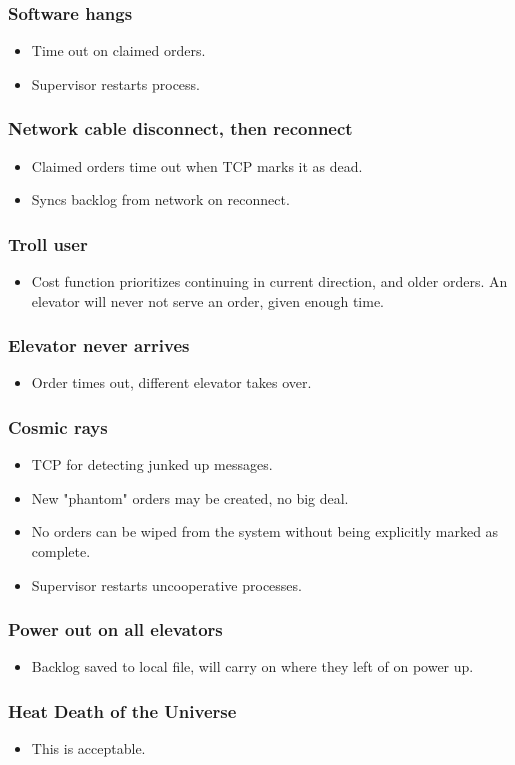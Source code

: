\documentclass[11pt,a4paper]{article}
\begin{document}
\subsubsection*{Software hangs}
\begin{itemize}
\item Time out on claimed orders.
\item Supervisor restarts process.
\end{itemize}
\subsubsection*{Network cable disconnect, then reconnect}
\begin{itemize}
\item Claimed orders time out when TCP marks it as dead.
\item Syncs backlog from network on reconnect.
\end{itemize}
\subsubsection*{Troll user}
\begin{itemize}
\item Cost function prioritizes continuing in current direction, and older orders. An elevator will never not serve an order, given enough time.
\end{itemize}
\subsubsection*{Elevator never arrives}
\begin{itemize}
\item Order times out, different elevator takes over.
\end{itemize}
\subsubsection*{Cosmic rays}
\begin{itemize}
\item TCP for detecting junked up messages.
\item New "phantom" orders may be created, no big deal.
\item No orders can be wiped from the system without being explicitly marked as complete.
\item Supervisor restarts uncooperative processes.
\end{itemize}
\subsubsection*{Power out on all elevators}
\begin{itemize}
\item Backlog saved to local file, will carry on where they left of on power up.
\end{itemize}
\subsubsection*{Heat Death of the Universe}
\begin{itemize}
\item This is acceptable.
\end{itemize}
\end{document}
